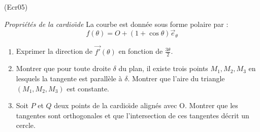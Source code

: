 \begin{tiny}(Ecr05)\end{tiny}
\emph{Propri{\'e}t{\'e}s de la cardio{\"\i}de}
La courbe est donn{\'e}e sous forme polaire par :
\[f(\theta)=O+(1+\cos \theta )\overrightarrow{e}_\theta\]
\begin{enumerate}
  \item Exprimer la direction de $\overrightarrow{f'}(\theta)$ en fonction de
  $\frac{3\theta}{2}$.
  \item Montrer que pour toute droite $\delta$ du plan, il
  existe trois points $M_1 , M_2 , M_3$ en lesquels la tangente est parall{\`e}le {\`a}
  $\delta$. Montrer que l'aire du triangle $(M_1 , M_2 , M_3)$ est
  constante.
  \item Soit $P$ et $Q$ deux points de la cardio{\"\i}de align{\'e}s avec
  O. Montrer que les tangentes sont orthogonales et que
  l'intersection de ces tangentes d{\'e}crit un cercle.
\end{enumerate}